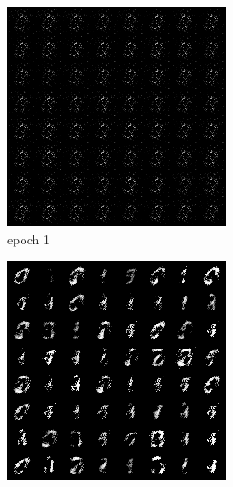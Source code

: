 \documentclass[a4paper]{article}
\theoremstyle{definition}
\newenvironment{soln}{
	\leavevmode\color{blue}\ignorespaces
}{}
\begin{document}
\begin{enumerate} [label=(\alph*)]
\begin{soln}
			\begin{figure}[H]
				\centering
				\begin{subfigure}[b]{0.3\textwidth}
					\centering
					\includegraphics[width=\textwidth]{../figs/gen_img1.png}
					\caption{epoch 1}
				\end{subfigure}
				\hfill
				\begin{subfigure}[b]{0.3\textwidth}
					\centering
					\includegraphics[width=\textwidth]{../figs/gen_img50.png}

\end{subfigure}
\end{figure}
\end{soln}
\end{enumerate}
\end{document}

